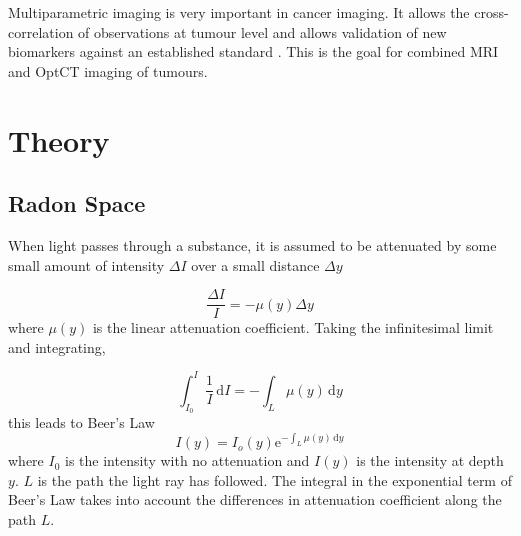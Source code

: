 \documentclass[12pt]{article}
\begin{document}

Multiparametric imaging is very important in cancer imaging. It allows the cross-correlation of observations at tumour level and allows validation of new biomarkers against an established standard \cite{Padhani:2010hfa}. This is the goal for combined MRI and OptCT imaging of tumours. 

\newpage
\section{Theory}
\label{sec:theory}




\subsection{Radon Space}

When light passes through a substance, it is assumed to be attenuated by some small amount of intensity $\Delta I$ over a small distance $\Delta y$ 

\begin{equation}
\dfrac{\Delta I}{I} = -\mu(y)\Delta y
\end{equation}
where $\mu(y)$ is the linear attenuation coefficient.
Taking the infinitesimal limit and integrating, 

\begin{equation}
\int_{I_0}^{I} \frac{1}{I}\, \mathrm{d}I = - \int_L \mu(y)\, \mathrm{d}y
\end{equation}
this leads to Beer's Law 
\begin{equation}
I(y) = I_{o}(y)\mathrm{e}^{-\int_L \mu(y)\, \mathrm{d}y}
\label{eq:Beer}
\end{equation}
where $I_0$ is the intensity with no attenuation and $I(y)$ is the intensity at depth $y$. $L$ is the path the light ray has followed. The integral in the exponential term of Beer's Law takes into account the differences in attenuation coefficient along the path $L$. 
\end{document}
